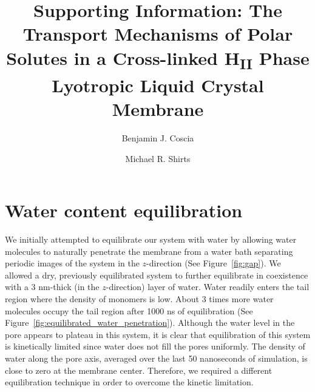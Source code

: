 \documentclass{article}
\title{Supporting Information: The Transport Mechanisms of Polar Solutes in a Cross-linked H\textsubscript{II} Phase Lyotropic Liquid Crystal Membrane}
\author{Benjamin J. Coscia \and Michael R. Shirts}
\begin{document}
  \maketitle
  \graphicspath{{./supporting_figures/}}
  

  \section{Water content equilibration}\label{section:water_content_equil}

  We initially attempted to equilibrate our system with water by allowing water
  molecules to naturally penetrate the membrane from a water bath separating
  periodic images of the system in the $z$-direction (See Figure~\ref{fig:gap}).
  We allowed a dry, previously equilibrated system to further equilibrate in
  coexistence with a 3 nm-thick (in the $z$-direction) layer of water. Water
  readily enters the tail region where the density of monomers is low. About 3
  times more water molecules occupy the tail region after 1000 ns of
  equilibration (See Figure~\ref{fig:equilibrated_water_penetration}). Although
  the water level in the pore appears to plateau in this system, it is clear that
  equilibration of this system is kinetically limited since water does not fill
  the pores uniformly. The density of water along the pore axis, averaged over
  the last 50 nanoseconds of simulation, is close to zero at the membrane center.
  Therefore, we required a different equilibration technique in order to overcome
  the kinetic limitation.
\end{document}
